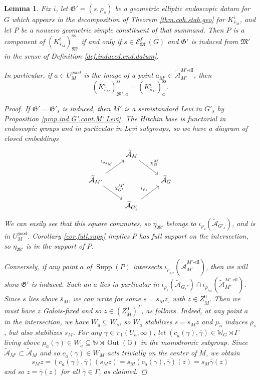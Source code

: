\documentclass[openany]{amsbook}
\newtheorem{lemma}[theorem]{Lemma}
\theoremstyle{definition}
\theoremstyle{remark}
\numberwithin{equation}{section}
\newcommand{\G}{\mathbb{G}}
\newcommand{\W}{\mathbb{W}}
\newcommand{\cA}{\mathcal{A}}
\newcommand{\cE}{\mathcal{E}}
\newcommand{\ol}[1]{\overline{#1}}
\renewcommand{\-}{\operatorname{-}}
\newcommand{\Supp}{\operatorname{Supp}}
\newcommand{\Out}{\operatorname{Out}}
\newcommand{\good}{\mathit{good}}
\newcommand{\wtilde}[1]{\widetilde{#1}}
\newcommand{\el}{\text{-ell}}
\newcommand{\ctA}{\widetilde{\cA}}
\newcommand{\fM}{\mathfrak{M}}
\newcommand{\fG}{\mathfrak{G}}
\renewcommand{\ss}{\mathrm{ss}}
\begin{document}
\begin{lemma}\label{lem.M.G.comp.of.supports}
    Fix $i$, let $\fG' = (s, \rho_s)$ be a geometric elliptic endoscopic datum for $G$ which appears in the decomposition of Theorem \ref{thm.coh.stab.geo} for $K^i_{\ol{s}_M}$, and let $P$ be a nonzero geometric simple constituent of that summand. Then $P$ is a component of $(K_{\ol{s}_M}^i)^{\ss}_{\fM'}$ if and only if $s \in \cE_{\fM'}^f(G)$ and $\fG'$ is induced from $\fM'$ in the sense of Definition \ref{def.induced.end.datum}.

    In particular, if $a \in U_M^{\good}$ is the image of a point $a_{M'} \in \ctA_{M'}^{M'\el}$, then
    $$
        (K_{\ol{s}_M}^i)^{\ss}_{\fM',a} = (K_{\ol{s}_M}^i)^{\ss}_a.
    $$
    \begin{proof}
        If $\fG' = \fG'_s$ is induced, then $M'$ is a semistandard Levi in $G'_s$ by Proposition \ref{prop.ind.G'.cont.M'.Levi}. The Hitchin base is functorial in endoscopic groups and in particular in Levi subgroups, so we have a diagram of closed embeddings 
$$
\begin{tikzcd}[ampersand replacement=\&]
    \& \ctA_{M} \ar[dr, "\chi^M_G"] \& \\
     \ctA_{M'} \ar[ur, "\iota_{\rho_{s_M}}"] \ar[dr, "\chi^{M'}_{G'}"] \& \& \ctA_G \\
     \& \ctA_{G'_s} \ar[ur, "\iota_{\rho_s}"] \& 
\end{tikzcd}
$$
We can easily see that this square commutes, so $\eta_{\fM'}$ belongs to $\iota_{\rho_{s}}(\ctA_{G'_s})$, and is in $U_M^{\good}$. Corollary \ref{cor.full.supp} implies $P$ has full support on the intersection, so $\eta_{\fM'}$ is in the support of $P$. 

Conversely, if \textit{any} point $a$ of $\Supp(P)$ intersects $\iota_{\rho_{s_M}}(\ctA_{M'}^{M'\el})$, then we will show $\fG'$ is induced. Such an $a$ lies in particular in $\iota_{\rho_s}(\ctA_{G_s'}) \cap \iota_{\rho_{s_M}}(\ctA_{M'}^{M'\el})$. Since $s$ lies above $\ol{s}_M$, we can write
for some $s = s_M z$, with $z \in Z_{\widehat{M}}^0$. Then we must have $z$ Galois-fixed and so $z \in (Z_{\widehat{M}}^{0})^{\Gamma}$, as follows. Indeed, at any point $a$ in the intersection, we have $W_{\wtilde{a}} \subseteq W_s$, so $W_{\wtilde{a}}$ stabilizes $s = s_M z$ and $\mu_{\wtilde{a}}$ induces $\rho_s$, but also stabilizes $s_M$. For any $\gamma \in \pi_1(U_a, \infty)$, let $(c_{\wtilde{a}}(\gamma), \ol{\gamma}) \in \W_G \rtimes \Gamma$ living above $\mu_{\wtilde{a}}(\gamma) \in W_{\wtilde{a}} \subseteq \W \rtimes \Out(\G)$ in the monodromic subgroup. Since $\ctA_{M'} \subset \ctA_{M}$ and so $c_{\wtilde{a}}(\gamma) \in W_M$ acts trivially on the center of $M$, we obtain
$$
    s_M z = (c_{\wtilde{a}}(\gamma), \ol{\gamma})(s_M z) = s_M (c_{\wtilde{a}}(\gamma), \ol{\gamma})(z) = s_M \ol{\gamma}(z)
$$
and so $z = \ol{\gamma}(z)$ for all $\ol{\gamma} \in \Gamma$, as claimed. 


\end{proof}
\end{lemma}
\end{document}
